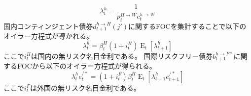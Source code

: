 \begin{equation}
\label{form:model_households_indices_aggregation_stage2_home_lambda_h_p_H_W_c_h_W_eq}
    \lambda_t^h=\frac{1}{p_t^{H\to W}c_t^{h\to W}}
\end{equation}
国内コンティンジェント債券\(d_{t+1}^{h\to H}(j')\)に関するFOCを集計することで以下のオイラー方程式が導かれる。
\begin{equation}
\label{form:model_households_indices_aggregation_stage2_home_lambda_h_i_H_eq}
    \lambda_t^h=\beta_t^H(1+i_t^H)\operatorname{E}_t[\lambda_{t+1}^h]
\end{equation}
ここで\(i_t^H\)は国内の無リスク名目金利である。
国際リスクフリー債券\(b_{t+1}^{h\to F*}\)に関するFOCから以下のオイラー方程式が得られる。
\begin{equation}
\label{form:model_households_indices_aggregation_stage2_home_lambda_h_i_F_eq}
    \lambda_t^he_t^{/*}=(1+i_t^F)\beta_t^H\operatorname{E}_t\left[\lambda_{t+1}^he_{t+1}^{/*}\right]
\end{equation}
ここで\(i_t^F\)は外国の無リスク名目金利である。


